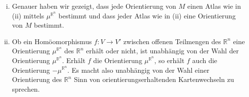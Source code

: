 \begin{bemerkung}
	\leavevmode
	\begin{enumerate}[i)]
		\item Genauer haben wir gezeigt, dass jede Orientierung von $M$ einen Atlas wie in (ii) mittels $\mu^{\mathbb{R}^n}$ bestimmt und dass jeder Atlas wie in (ii) eine Orientierung von $M$ bestimmt.
		\item Ob ein Homöomorphismus $f \colon V \to V'$ zwischen offenen Teilmengen des $\mathbb{R}^n$ eine Orientierung $\mu^{\mathbb{R}^n}$ des $\mathbb{R}^n$ erhält oder nicht, ist unabhängig von der Wahl der Orientierung $\mu^{\mathbb{R}^n}$.
		Erhält $f$ die Orientierung $\mu^{\mathbb{R}^n}$, so erhält $f$ auch die Orientierung $-\mu^{\mathbb{R}^n}$.
		Es macht also unabhängig von der Wahl einer Orientierung des $\mathbb{R}^n$ Sinn von orientierungserhaltenden Kartenwechseln zu sprechen.
	\end{enumerate}
\end{bemerkung}

